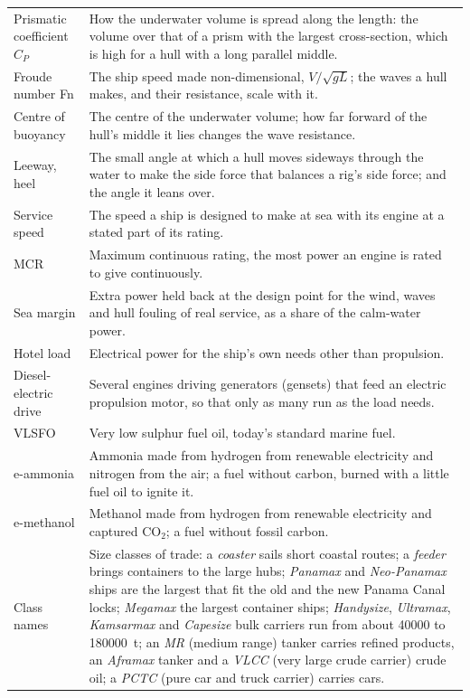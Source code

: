 \begin{longtable}{@{}p{}p{}@{}}
Prismatic coefficient $C_P$ & How the underwater volume is spread along the length: the volume over that of a prism with the largest cross-section, which is high for a hull with a long parallel middle. \\
Froude number Fn & The ship speed made non-dimensional, $V/\sqrt{gL}$; the waves a hull makes, and their resistance, scale with it. \\
Centre of buoyancy & The centre of the underwater volume; how far forward of the hull's middle it lies changes the wave resistance. \\
Leeway, heel & The small angle at which a hull moves sideways through the water to make the side force that balances a rig's side force; and the angle it leans over. \\
Service speed & The speed a ship is designed to make at sea with its engine at a stated part of its rating. \\
MCR & Maximum continuous rating, the most power an engine is rated to give continuously. \\
Sea margin & Extra power held back at the design point for the wind, waves and hull fouling of real service, as a share of the calm-water power. \\
Hotel load & Electrical power for the ship's own needs other than propulsion. \\
Diesel-electric drive & Several engines driving generators (gensets) that feed an electric propulsion motor, so that only as many run as the load needs. \\
VLSFO & Very low sulphur fuel oil, today's standard marine fuel. \\
e-ammonia & Ammonia made from hydrogen from renewable electricity and nitrogen from the air; a fuel without carbon, burned with a little fuel oil to ignite it. \\
e-methanol & Methanol made from hydrogen from renewable electricity and captured CO$_2$; a fuel without fossil carbon. \\
Class names & Size classes of trade: a \emph{coaster} sails short coastal routes; a \emph{feeder} brings containers to the large hubs; \emph{Panamax} and \emph{Neo-Panamax} ships are the largest that fit the old and the new Panama Canal locks; \emph{Megamax} the largest container ships; \emph{Handysize}, \emph{Ultramax}, \emph{Kamsarmax} and \emph{Capesize} bulk carriers run from about \num{40000} to \num{180000}~t; an \emph{MR} (medium range) tanker carries refined products, an \emph{Aframax} tanker and a \emph{VLCC} (very large crude carrier) crude oil; a \emph{PCTC} (pure car and truck carrier) carries cars. \\

\end{longtable}
